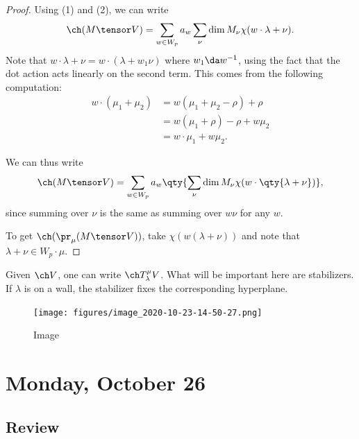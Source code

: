 \begin{proof}

Using (1) and (2), we can write
\begin{align*}  
\ch(M\tensor V) = 
\sum_{w\in W_p} a_w \sum_\nu \dim M_\nu \chi(w\cdot \lambda + \nu)
.\end{align*} Note that
\(w\cdot \lambda + \nu = w\cdot (\lambda + w_1 \nu)\) where
\(w_1 \da w^{-1}\), using the fact that the dot action acts linearly on
the second term. This comes from the following computation:
\begin{align*}  
w\cdot(\mu_1 + \mu_2)
&= w(\mu_1 + \mu_2 - \rho) + \rho \\
&= w(\mu_1 + \rho) - \rho + w\mu_2 \\
&= w\cdot \mu_1 + w\mu_2
.\end{align*}

We can thus write
\begin{align*}  
\ch(M\tensor V) = 
\sum_{w\in W_p} a_w \qty{ \sum_\nu \dim M_\nu \chi(w\cdot \qty{\lambda + \nu})}
,\end{align*} since summing over \(\nu\) is the same as summing over
\(w\nu\) for any \(w\).

To get \(\ch(\pr_\mu(M\tensor V))\), take \(\chi(w(\lambda + \nu))\) and
note that \(\lambda + \nu \in W_p \cdot \mu\).

\end{proof}

\begin{remark}

Given \(\ch V\), one can write \(\ch T_\lambda^\mu V\). What will be
important here are stabilizers. If \(\lambda\) is on a wall, the
stabilizer fixes the corresponding hyperplane.

\begin{figure}
\centering
\texttt{[image: figures/image\_2020-10-23-14-50-27.png]}
\caption{Image}
\end{figure}

\end{remark}

\hypertarget{monday-october-26}{%
\section{Monday, October 26}\label{monday-october-26}}

\hypertarget{review-2}{%
\subsection{Review}\label{review-2}}

